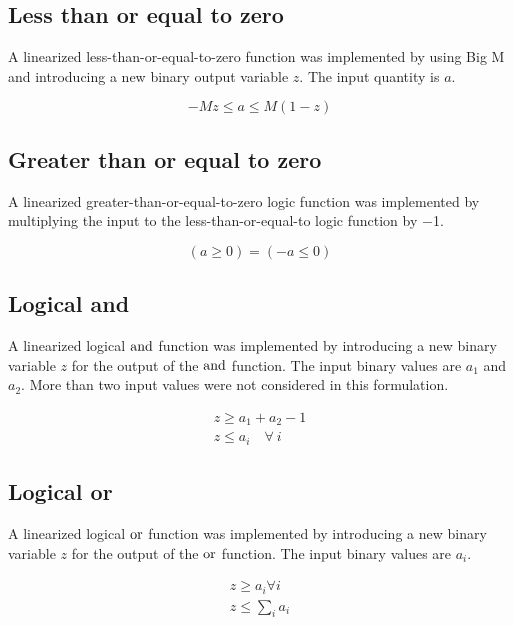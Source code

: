 \subsection{Less than or equal to zero}

A linearized less-than-or-equal-to-zero function was implemented by using Big M and introducing a new binary output variable $z$. The input quantity is $a$.

\begin{equation}
-M z \le a \le M (1 - z)
\end{equation}

\subsection{Greater than or equal to zero}

A linearized greater-than-or-equal-to-zero logic function was implemented by multiplying the input to the less-than-or-equal-to logic function by \num{-1}.

\begin{equation}
\left(a \ge 0\right) = \left(-a \le 0\right)
\end{equation}

\subsection{Logical and}

A linearized logical $\operatorname{and}$ function was implemented by introducing a new binary variable $z$ for the output of the $\operatorname{and}$ function.
The input binary values are $a_1$ and $a_2$.
More than two input values were not considered in this formulation.

\begin{gather}
z \ge a_1 + a_2 - 1
\\
z \le a_i \quad \forall \ i
\end{gather}

\subsection{Logical or}

A linearized logical $\operatorname{or}$ function was implemented by introducing a new binary variable $z$ for the output of the $\operatorname{or}$ function.
The input binary values are $a_i$.

\begin{gather}
z \ge a_i \forall i
\\
z \le \sum_i a_i
\end{gather}
